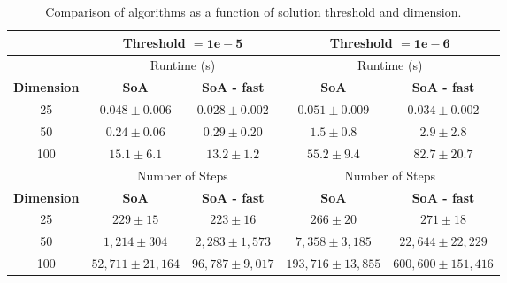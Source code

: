 \begin{table}[]
  \centering
  \caption{Comparison of algorithms as a function of solution threshold and
    dimension.}
  \label{tab:threshold}
\begin{tabular}{ccc|cc}\toprule
                                  & \multicolumn{2}{c|}{\textbf{Threshold} $\mathbf{ =
                                    1e-5}$}                         &
                                                                      \multicolumn{2}{|c}{
                                                                     \textbf{Threshold}
                                                                      $\mathbf{ = 1e-6}$}                                          \\\midrule
                   & \multicolumn{2}{c|}{Runtime (s)} &
                                                       \multicolumn{2}{c}{Runtime (s)}\\\midrule
  \textbf{Dimension} & \textbf{SoA} & \textbf{SoA - fast} & \textbf{SoA} & \textbf{SoA - fast}\\
             25              & $0.048 \pm 0.006$   & $0.028 \pm 0.002$  & $0.051 \pm 0.009$    & $0.034 \pm 0.002$   \\
             50             & $0.24 \pm 0.06$     & $0.29 \pm 0.20$    & $1.5 \pm 0.8$        & $2.9 \pm 2.8$       \\
             100         & $15.1 \pm 6.1$      & $13.2 \pm 1.2$     & $55.2 \pm 9.4$       & $82.7 \pm 20.7$    \\\midrule
              & \multicolumn{2}{c|}{Number of Steps} & \multicolumn{2}{c}{Number
                                                      of Steps}\\\midrule
  \textbf{Dimension} & \textbf{SoA} & \textbf{SoA - fast} & \textbf{SoA} & \textbf{SoA - fast}\\
              25        & $229 \pm 15$        & $223 \pm 16$       & $266 \pm 20$         & $271 \pm 18$        \\
             50        & $1,214 \pm 304$     & $2,283 \pm 1,573$   & $7,358 \pm 3,185$    & $22,644 \pm 22,229$ \\
             100       & $52,711 \pm 21,164$ & $96,787 \pm 9,017$ & $193,716 \pm
                                                                    13,855$ &
                                                                              $600,600
                                                                              \pm
  151,416$ \\\bottomrule
\end{tabular}
\end{table}

